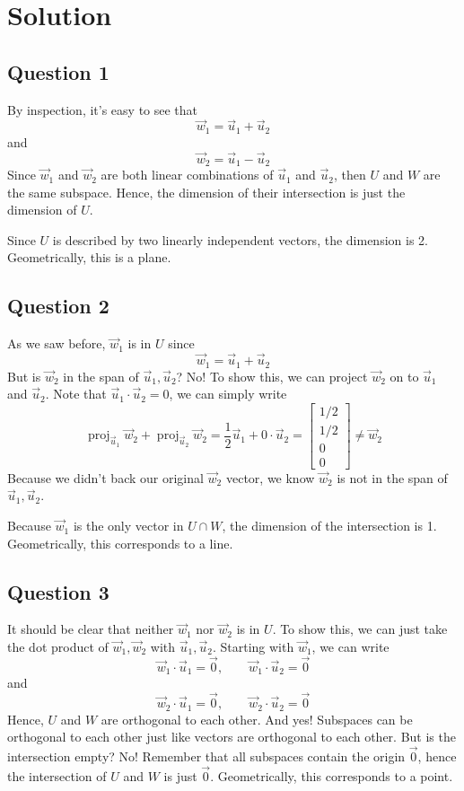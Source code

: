 \documentclass[11pt]{article}
\begin{document}
\section*{Solution}
\subsection*{Question 1}
By inspection, it's easy to see that 
\[
\vec{w}_1 = \vec{u}_1 + \vec{u}_2
\]
and 
\[
\vec{w}_2 = \vec{u}_1 - \vec{u}_2
\]
Since $\vec{w}_1$ and $\vec{w}_2$ are both linear combinations of $\vec{u}_1$ and $\vec{u}_2$, then $U$ and $W$ are the same subspace. Hence, the dimension of their intersection is just the dimension of $U$.

Since $U$ is described by two linearly independent vectors, the dimension is 2. Geometrically, this is a plane.

\subsection*{Question 2}
As we saw before, $\vec{w}_1$ is in $U$ since
\[
\vec{w}_1 = \vec{u}_1 + \vec{u}_2
\]
But is $\vec{w}_2$ in the span of $\vec{u}_1,\vec{u}_2$? No! To show this, we can project $\vec{w}_2$ on to $\vec{u}_1$ and $\vec{u}_2$. Note that $\vec{u}_1\cdot \vec{u}_2=0$, we can simply write 
\[
\operatorname{proj}_{\vec{u}_1}\vec{w}_2 + \operatorname{proj}_{\vec{u}_2}\vec{w}_2 = \frac{1}{2}\vec{u}_1 + 0\cdot \vec{u}_2= \begin{bmatrix}
    1/2\\1/2\\0\\0
\end{bmatrix}\neq \vec{w}_2
\]
Because we didn't back our original $\vec{w}_2$ vector, we know $\vec{w}_2$ is not in the span of $\vec{u}_1,\vec{u}_2$.

Because $\vec{w}_1$ is the only vector in $U\cap W$, the dimension of the intersection is 1. Geometrically, this corresponds to a line.

\subsection*{Question 3}
It should be clear that neither $\vec{w}_1$ nor $\vec{w}_2$ is in $U$. To show this, we can just take the dot product of $\vec{w}_1,\vec{w}_2$ with $\vec{u}_1,\vec{u}_2$. Starting with $\vec{w}_1$, we can write 
\[
\vec{w}_1\cdot \vec{u}_1 = \vec{0},\qquad \vec{w}_1\cdot \vec{u}_2 = \vec{0}
\]
and
\[
\vec{w}_2\cdot \vec{u}_1 = \vec{0},\qquad \vec{w}_2\cdot \vec{u}_2 = \vec{0}
\]
Hence, $U$ and $W$ are orthogonal to each other. And yes! Subspaces can be orthogonal to each other just like vectors are orthogonal to each other. But is the intersection empty? No! Remember that all subspaces contain the origin $\vec{0}$, hence the intersection of $U$ and $W$ is just $\vec{0}$. Geometrically, this corresponds to a point.
\end{document}
